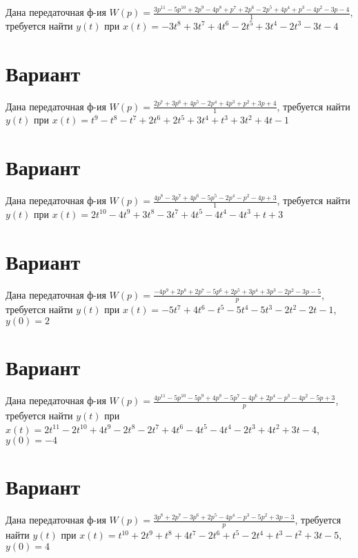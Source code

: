 \documentclass{article}
\begin{document}
Дана передаточная ф-ия $W(p)=\frac{3p^{11}-5p^{10}+2p^{9}-4p^{8}+p^{7}+2p^{6}-2p^{5}+4p^{4}+p^{3}-4p^{2}-3p-4}{1}$, требуется найти $y(t)$ при $x(t)=-3t^{8}+3t^{7}+4t^{6}-2t^{5}+3t^{4}-2t^{3}-3t-4$



\section{Вариант}

Дана передаточная ф-ия $W(p)=\frac{2p^{7}+3p^{6}+4p^{5}-2p^{4}+4p^{3}+p^{2}+3p+4}{1}$, требуется найти $y(t)$ при $x(t)=t^{9}-t^{8}-t^{7}+2t^{6}+2t^{5}+3t^{4}+t^{3}+3t^{2}+4t-1$



\section{Вариант}

Дана передаточная ф-ия $W(p)=\frac{4p^{8}-3p^{7}+4p^{6}-5p^{5}-2p^{4}-p^{2}-4p+3}{1}$, требуется найти $y(t)$ при $x(t)=2t^{10}-4t^{9}+3t^{8}-3t^{7}+4t^{5}-4t^{4}-4t^{3}+t+3$



\section{Вариант}

Дана передаточная ф-ия $W(p)=\frac{-4p^{9}+2p^{8}+2p^{7}-5p^{6}+2p^{5}+3p^{4}+3p^{3}-2p^{2}-3p-5}{p}$, требуется найти $y(t)$ при $x(t)=-5t^{7}+4t^{6}-t^{5}-5t^{4}-5t^{3}-2t^{2}-2t-1$, $y(0)=2$



\section{Вариант}

Дана передаточная ф-ия $W(p)=\frac{4p^{11}-5p^{10}-5p^{9}+4p^{8}-5p^{7}-4p^{6}+2p^{4}-p^{3}-4p^{2}-5p+3}{p}$, требуется найти $y(t)$ при $x(t)=2t^{11}-2t^{10}+4t^{9}-2t^{8}-2t^{7}+4t^{6}-4t^{5}-4t^{4}-2t^{3}+4t^{2}+3t-4$, $y(0)=-4$



\section{Вариант}

Дана передаточная ф-ия $W(p)=\frac{3p^{8}+2p^{7}-3p^{6}+2p^{5}-4p^{4}-p^{3}-5p^{2}+3p-3}{p}$, требуется найти $y(t)$ при $x(t)=t^{10}+2t^{9}+t^{8}+4t^{7}-2t^{6}+t^{5}-2t^{4}+t^{3}-t^{2}+3t-5$, $y(0)=4$
\end{document}

